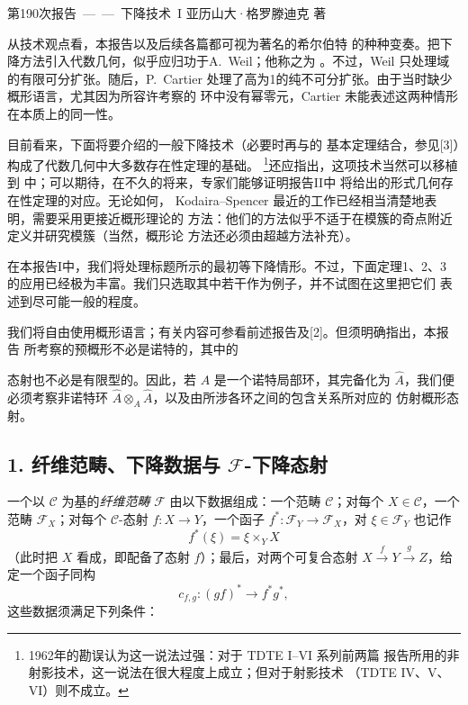 \unit{第190次报告——下降技术 I}
%
  {亚历山大·格罗滕迪克 著}

从技术观点看，本报告以及后续各篇都可视为著名的希尔伯特
的种种变奏。把下降方法引入代数几何，似乎应归功于A.~Weil；他称之为
。不过，Weil 只处理域的有限可分扩张。随后，P.~Cartier
处理了高为1的纯不可分扩张。由于当时缺少概形语言，尤其因为所容许考察的
环中没有幂零元，Cartier 未能表述这两种情形在本质上的同一性。

目前看来，下面将要介绍的一般下降技术（必要时再与的
基本定理结合，参见[3]）构成了代数几何中大多数存在性定理的基础。
\footnote{1962年的勘误认为这一说法过强：对于 TDTE I--VI 系列前两篇
报告所用的非射影技术，这一说法在很大程度上成立；但对于射影技术
（TDTE IV、V、VI）则不成立。}还应指出，这项技术当然可以移植到
中；可以期待，在不久的将来，专家们能够证明报告II中
将给出的形式几何存在性定理的对应。无论如何，
Kodaira--Spencer 最近的工作已经相当清楚地表明，需要采用更接近概形理论的
方法：他们的方法似乎不适于在模簇的奇点附近定义并研究模簇（当然，概形论
方法还必须由超越方法补充）。

在本报告I中，我们将处理标题所示的最初等下降情形。不过，下面定理1、2、3
的应用已经极为丰富。我们只选取其中若干作为例子，并不试图在这里把它们
表述到尽可能一般的程度。

我们将自由使用概形语言；有关内容可参看前述报告及[2]。但须明确指出，本报告
所考察的预概形不必是诺特的，其中的

态射也不必是有限型的。因此，若 $A$ 是一个诺特局部环，其完备化为
$\widehat A$，我们便必须考察非诺特环
$\widehat A\otimes_A\widehat A$，以及由所涉各环之间的包含关系所对应的
仿射概形态射。


\subsection*{1. 纤维范畴、下降数据与 $\mathcal F$-下降态射}

 一个以 $\mathcal C$ 为基的\emph{纤维范畴}
$\mathcal F$ 由以下数据组成：一个范畴 $\mathcal C$；对每个
$X\in\mathcal C$，一个范畴 $\mathcal F_X$；对每个
$\mathcal C$-态射 $f:X\longrightarrow Y$，一个函子
$f^*:\mathcal F_Y\longrightarrow\mathcal F_X$，对
$\xi\in\mathcal F_Y$ 也记作
\[
  f^*(\xi)=\xi\times_Y X
\]
（此时把 $X$ 看成，即配备了态射
$f$）；最后，对两个可复合态射
$X\xrightarrow{f}Y\xrightarrow{g}Z$，给定一个函子同构
\[
  c_{f,g}:(gf)^*\longrightarrow f^*g^*,
\]
这些数据须满足下列条件：

